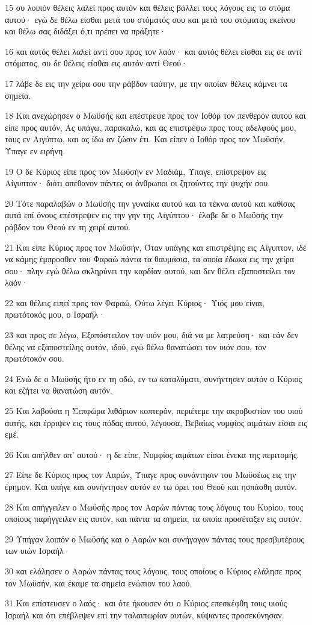 \par 15 συ λοιπόν θέλεις λαλεί προς αυτόν και θέλεις βάλλει τους λόγους εις το στόμα αυτού· εγώ δε θέλω είσθαι μετά του στόματός σου και μετά του στόματος εκείνου και θέλω σας διδάξει ό,τι πρέπει να πράξητε·
\par 16 και αυτός θέλει λαλεί αντί σου προς τον λαόν· και αυτός θέλει είσθαι εις σε αντί στόματος, συ δε θέλεις είσθαι εις αυτόν αντί Θεού·
\par 17 λάβε δε εις την χείρα σου την ράβδον ταύτην, με την οποίαν θέλεις κάμνει τα σημεία.
\par 18 Και ανεχώρησεν ο Μωϋσής και επέστρεψε προς τον Ιοθόρ τον πενθερόν αυτού και είπε προς αυτόν, Ας υπάγω, παρακαλώ, και ας επιστρέψω προς τους αδελφούς μου, τους εν Αιγύπτω, και ας ίδω αν ζώσιν έτι. Και είπεν ο Ιοθόρ προς τον Μωϋσήν, Ύπαγε εν ειρήνη.
\par 19 Ο δε Κύριος είπε προς τον Μωϋσήν εν Μαδιάμ, Ύπαγε, επίστρεψον εις Αίγυπτον· διότι απέθανον πάντες οι άνθρωποι οι ζητούντες την ψυχήν σου.
\par 20 Τότε παραλαβών ο Μωϋσής την γυναίκα αυτού και τα τέκνα αυτού και καθίσας αυτά επί όνους επέστρεψεν εις την γην της Αιγύπτου· έλαβε δε ο Μωϋσής την ράβδον του Θεού εν τη χειρί αυτού.
\par 21 Και είπε Κύριος προς τον Μωϋσήν, Όταν υπάγης και επιστρέψης εις Αίγυπτον, ιδέ να κάμης έμπροσθεν του Φαραώ πάντα τα θαυμάσια, τα οποία έδωκα εις την χείρα σου· πλην εγώ θέλω σκληρύνει την καρδίαν αυτού, και δεν θέλει εξαποστείλει τον λαόν·
\par 22 και θέλεις ειπεί προς τον Φαραώ, Ούτω λέγει Κύριος· Υιός μου είναι, πρωτότοκός μου, ο Ισραήλ·
\par 23 και προς σε λέγω, Εξαπόστειλον τον υιόν μου, διά να με λατρεύση· και εάν δεν θέλης να εξαποστείλης αυτόν, ιδού, εγώ θέλω θανατώσει τον υιόν σου, τον πρωτότοκόν σου.
\par 24 Ενώ δε ο Μωϋσής ήτο εν τη οδώ, εν τω καταλύματι, συνήντησεν αυτόν ο Κύριος και εζήτει να θανατώση αυτόν.
\par 25 Και λαβούσα η Σεπφώρα λιθάριον κοπτερόν, περιέτεμε την ακροβυστίαν του υιού αυτής, και έρριψεν εις τους πόδας αυτού, λέγουσα, Βεβαίως νυμφίος αιμάτων είσαι εις εμέ.
\par 26 Και απήλθεν απ' αυτού· η δε είπε, Νυμφίος αιμάτων είσαι ένεκα της περιτομής.
\par 27 Είπε δε Κύριος προς τον Ααρών, Ύπαγε προς συνάντησιν του Μωϋσέως εις την έρημον. Και υπήγε και συνήντησεν αυτόν εν τω όρει του Θεού και ησπάσθη αυτόν.
\par 28 Και απήγγειλεν ο Μωϋσής προς τον Ααρών πάντας τους λόγους του Κυρίου, τους οποίους παρήγγειλεν εις αυτόν, και πάντα τα σημεία, τα οποία προσέταξεν εις αυτόν.
\par 29 Υπήγαν λοιπόν ο Μωϋσής και ο Ααρών και συνήγαγον πάντας τους πρεσβυτέρους των υιών Ισραήλ·
\par 30 και ελάλησεν ο Ααρών πάντας τους λόγους, τους οποίους ο Κύριος ελάλησε προς τον Μωϋσήν, και έκαμε τα σημεία ενώπιον του λαού.
\par 31 Και επίστευσεν ο λαός· και ότε ήκουσεν ότι ο Κύριος επεσκέφθη τους υιούς Ισραήλ και ότι επέβλεψεν επί την ταλαιπωρίαν αυτών, κύψαντες προσεκύνησαν.

